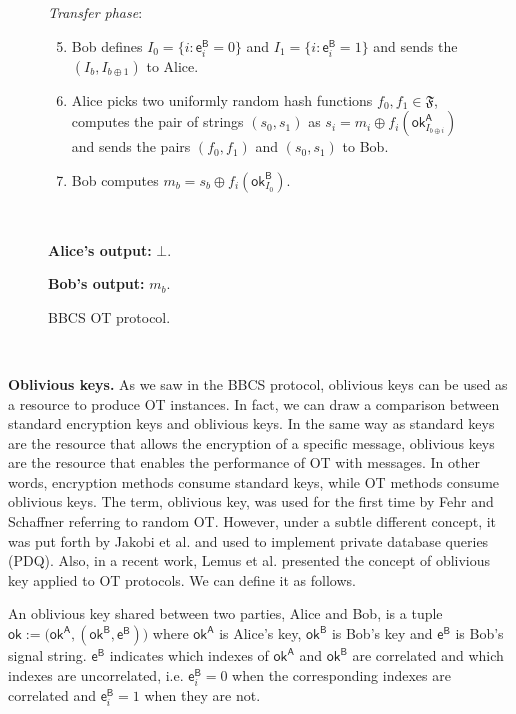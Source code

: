\begin{figure}[h!]
\begin{tcolorbox}
            \textit{Transfer phase}:
            \begin{enumerate}
            \setcounter{enumi}{4}
                \item Bob defines $I_0 = \{ i : \mathsf{e}^{\mathsf{B}}_i = 0 \}$ and $I_1 = \{ i : \mathsf{e}^{\mathsf{B}}_i = 1 \}$ and sends the $(I_b, I_{b\oplus 1})$ to Alice.
                \item Alice picks two uniformly random hash functions $f_0, f_1 \in \mathfrak{F}$, computes the pair of strings $(s_0, s_1)$ as $s_i = m_i \oplus f_i(\mathsf{ok}^{\mathsf{A}}_{I_{b\oplus i}})$ and sends the pairs $(f_0, f_1)$ and $(s_0, s_1)$ to Bob.
                \item Bob computes $m_b = s_b \oplus  f_i(\mathsf{ok}^{\mathsf{B}}_{I_0})$. 
            \end{enumerate}
            
            \
            
        \textbf{Alice's output:} $\bot$.
        
        \textbf{Bob's output:} $m_b$.
        
        \end{tcolorbox}
    \caption{BBCS OT protocol.}
    \label{fig:BBCS}
\end{figure}

\

\noindent\textbf{Oblivious keys.}  As we saw in the BBCS protocol, oblivious keys can be used as a resource to produce OT instances. In fact, we can draw a comparison between standard encryption keys and oblivious keys. In the same way as standard keys are the resource that allows the encryption of a specific message, oblivious keys are the resource that enables the performance of OT with messages. In other words, encryption methods consume standard keys, while OT methods consume oblivious keys. The term, oblivious key, was used for the first time by Fehr and Schaffner \cite{FS09} referring to random OT. However, under a subtle different concept, it was put forth by Jakobi et al. \cite{JSGBBWZ11} and used to implement private database queries (PDQ). Also, in a recent work, Lemus et al. \cite{Lemus20} presented the concept of oblivious key applied to OT protocols. We can define it as follows.

\begin{definition}
An oblivious key shared between two parties, Alice and Bob, is a tuple $\mathsf{ok}:= \big( \mathsf{ok}^{\mathsf{A}}, (\mathsf{ok}^{\mathsf{B}}, \mathsf{e}^{\mathsf{B}}) \big)$ where $\mathsf{ok}^{\mathsf{A}}$ is Alice's key, $\mathsf{ok}^{\mathsf{B}}$ is Bob's key and $\mathsf{e}^{\mathsf{B}}$ is Bob's signal string. $\mathsf{e}^{\mathsf{B}}$ indicates which indexes of $\mathsf{ok}^{\mathsf{A}}$ and $\mathsf{ok}^{\mathsf{B}}$ are correlated and which indexes are uncorrelated, i.e. $\mathsf{e}^{\mathsf{B}}_i = 0$ when the corresponding indexes are correlated and $\mathsf{e}^{\mathsf{B}}_i = 1$ when they are not.
\label{def:ok}
\end{definition}


